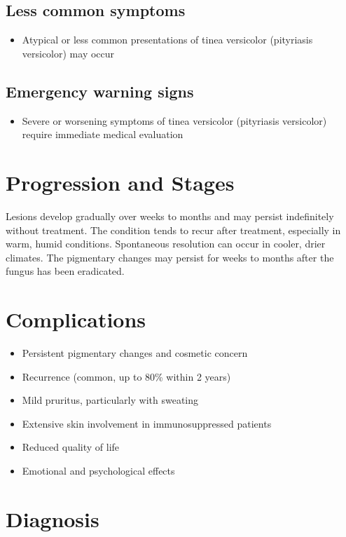 \subsection{Less common symptoms}
\begin{itemize}[noitemsep]
  \item Atypical or less common presentations of tinea versicolor (pityriasis versicolor) may occur
\end{itemize}

\subsection{Emergency warning signs}
\begin{itemize}[noitemsep]
  \item Severe or worsening symptoms of tinea versicolor (pityriasis versicolor) require immediate medical evaluation
\end{itemize}
\section{Progression and Stages}
Lesions develop gradually over weeks to months and may persist indefinitely without treatment. The condition tends to recur after treatment, especially in warm, humid conditions. Spontaneous resolution can occur in cooler, drier climates. The pigmentary changes may persist for weeks to months after the fungus has been eradicated.

\section{Complications}

\begin{itemize}[noitemsep]
  \item Persistent pigmentary changes and cosmetic concern
  \item Recurrence (common, up to 80\% within 2 years)
  \item Mild pruritus, particularly with sweating
  \item Extensive skin involvement in immunosuppressed patients
  \item Reduced quality of life
  \item Emotional and psychological effects
\end{itemize}

\section{Diagnosis}


